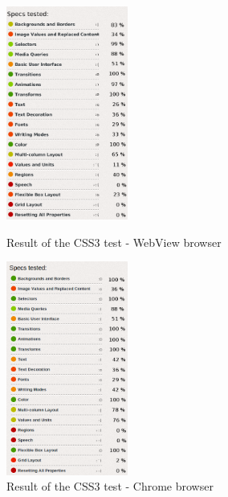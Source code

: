 \begin{figure}
\begin{minipage}[t]{7cm}
	\centering
	\includegraphics[width=4cm]{./img/tech-ana/css3_webview.png}
	\caption{Result of the CSS3 test - WebView browser}
	\label{fig:css3_webview}
\end{minipage}
\hfill
\begin{minipage}[t]{7cm}
	\centering
	\includegraphics[width=4cm]{./img/tech-ana/css3_chrome.png}
	\caption{Result of the CSS3 test - Chrome browser}
	\label{fig:css3_chrome}
\end{minipage}
\end{figure}



